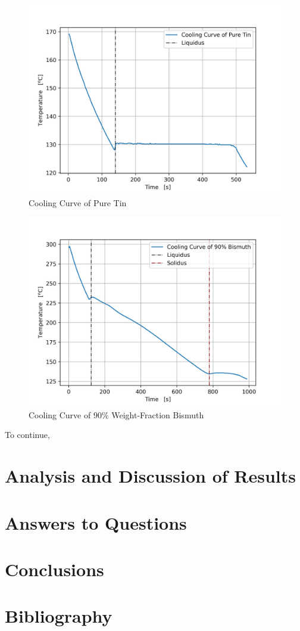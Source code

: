 \documentclass{article}
\begin{document}
\begin{figure}
    \centering
    \includegraphics[width=0.5\linewidth]{plots/q1_00.png}
    \caption{Cooling Curve of Pure Tin}
    \label{fig:q1-00}
\end{figure}

\begin{figure}
    \centering
    \includegraphics[width=0.5\linewidth]{plots/q1_90.png}
    \caption{Cooling Curve of 90\% Weight-Fraction Bismuth}
    \label{fig:q1-90}
\end{figure}

To continue, 


\section{Analysis and Discussion of Results}

\section{Answers to Questions}

\section{Conclusions}

\section{Bibliography}
\end{document}
